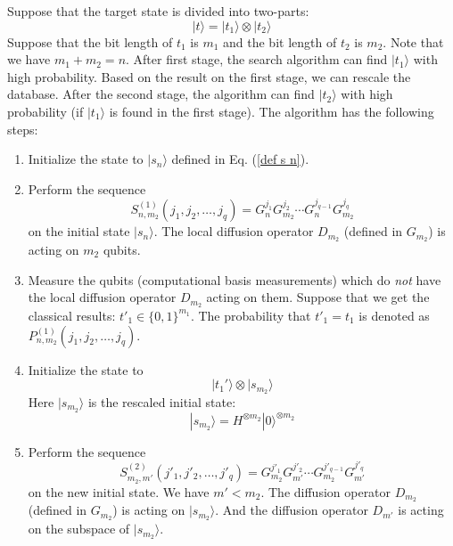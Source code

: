 \documentclass[%
 twocolumn,
 10pt,
 superscriptaddress,
 longbibliography,
 amsmath,amssymb,
 aps,
 pra,
floatfix,
]{revtex4-1}
\begin{document}
Suppose that the target state is divided into two-parts:
\begin{equation}
	\label{eqa t t1}
	|t\rangle=|t_1\rangle\otimes|t_2\rangle
\end{equation}
Suppose that the bit length of $t_1$ is $m_1$ and the bit length of $t_2$ is $m_2$. Note that we have $m_1+m_2=n$. After first stage, the search algorithm can find $|t_1\rangle$ with high probability. Based on the result on the first stage, we can rescale the database. After the second stage, the algorithm can find $|t_2\rangle$ with high probability (if $|t_1\rangle$ is found in the first stage). The algorithm has the following steps:

\begin{enumerate}[Step 1:]

	\item Initialize the state to $|s_n\rangle$ defined in Eq. (\ref{def s n}).

	\item Perform the sequence
	      \begin{equation}
		      S^{(1)}_{n,m_2}(j_1,j_2,\ldots,j_q) = G_n^{j_1}G_{m_2}^{j_{2}}\cdots G_n^{j_{q-1}}G_{m_2}^{j_q}
	      \end{equation}
	      on the initial state $|s_n\rangle$. The local diffusion operator $D_{m_2}$ (defined in $G_{m_2}$) is acting on $m_2$ qubits.

	\item Measure the qubits (computational basis measurements) which do \textit{not} have the local diffusion operator $D_{m_2}$ acting on them. Suppose that we get the classical results: $t'_1\in\{0,1\}^{m_1}$. The probability that $t'_1=t_1$ is denoted as $P^{(1)}_{n,m_2}(j_1,j_2,\ldots,j_q)$.

	\item Initialize the state to
	      $$ |t_1'\rangle\otimes|s_{m_2}\rangle
	      $$
	      Here $|s_{m_2}\rangle$ is the rescaled initial state:
	      \begin{equation}
		      |s_{m_2}\rangle = H^{\otimes m_2}|0\rangle^{\otimes m_2}
	      \end{equation}

	\item Perform the sequence
	      \begin{equation}
		      S^{(2)}_{m_2,m'}(j'_1,j'_2,\ldots,j'_q) = G_{m_2}^{j'_1}G_{m'}^{j'_2}\cdots G_{m_2}^{j'_{q-1}}G_{m'}^{j'_q}
	      \end{equation}
	      on the new initial state. We have $m'<m_2$. The diffusion operator $D_{m_2}$ (defined in $G_{m_2}$) is acting on $|s_{m_2}\rangle$. And the diffusion operator $D_{m'}$ is acting on the subspace of $|s_{m_2}\rangle$.


\end{enumerate}
\end{document}
